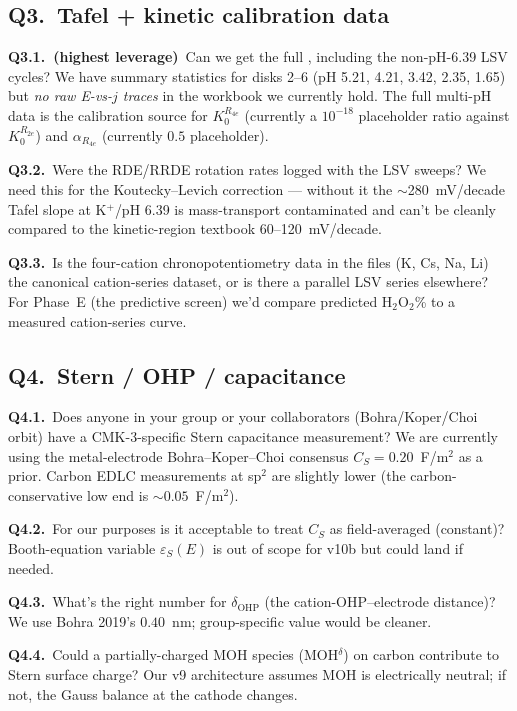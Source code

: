 \documentclass[11pt]{article}
\begin{document}
\subsection*{Q3.\ Tafel + kinetic calibration data}

\begin{questionbox}
\textbf{Q3.1.~(highest leverage)}~Can we get the full
, including the
non-pH-6.39 LSV cycles?  We have summary statistics for disks 2--6
(pH 5.21, 4.21, 3.42, 2.35, 1.65) but \emph{no raw E-vs-$j$ traces}
in the workbook we currently hold.  The full multi-pH data is the
calibration source for $K_0^{R_{4e}}$ (currently a $10^{-18}$
placeholder ratio against $K_0^{R_{2e}}$) and $\alpha_{R_{4e}}$
(currently $0.5$ placeholder).

\textbf{Q3.2.}~Were the RDE/RRDE rotation rates logged with the LSV
sweeps?  We need this for the Koutecky--Levich correction --- without
it the $\sim$280~mV/decade Tafel slope at K$^+$/pH 6.39 is
mass-transport contaminated and can't be cleanly compared to the
kinetic-region textbook 60--120~mV/decade.

\textbf{Q3.3.}~Is the four-cation chronopotentiometry data in the
 files (K, Cs, Na, Li) the canonical
cation-series dataset, or is there a parallel LSV series elsewhere?
For Phase~E (the predictive screen) we'd compare predicted H$_2$O$_2$\%
to a measured cation-series curve.
\end{questionbox}

\subsection*{Q4.\ Stern / OHP / capacitance}

\begin{questionbox}
\textbf{Q4.1.}~Does anyone in your group or your collaborators
(Bohra/Koper/Choi orbit) have a CMK-3-specific Stern capacitance
measurement?  We are currently using the metal-electrode
Bohra--Koper--Choi consensus $C_S=0.20$~F/m$^2$ as a prior.  Carbon
EDLC measurements at sp$^2$ are slightly lower (the carbon-conservative
low end is $\sim 0.05$~F/m$^2$).

\textbf{Q4.2.}~For our purposes is it acceptable to treat $C_S$ as
field-averaged (constant)?  Booth-equation variable $\varepsilon_S(E)$
is out of scope for v10b but could land if needed.

\textbf{Q4.3.}~What's the right number for $\delta_{\mathrm{OHP}}$
(the cation-OHP--electrode distance)?  We use Bohra 2019's
$0.40$~nm; group-specific value would be cleaner.

\textbf{Q4.4.}~Could a partially-charged MOH species
(MOH$^{\delta}$) on carbon contribute to Stern surface charge?  Our
v9 architecture assumes MOH is electrically neutral; if not, the
Gauss balance at the cathode changes.
\end{questionbox}
\end{document}

